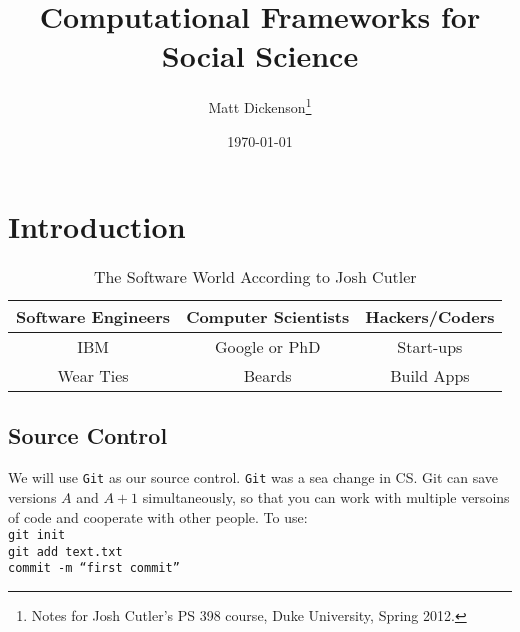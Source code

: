 \documentclass[12pt,letter]{article}
\begin{document}
\title{Computational Frameworks for Social Science}

\author{Matt Dickenson\thanks{Notes for Josh Cutler's PS 398 course, Duke
    University, Spring 2012.}}

\date{\today}

\maketitle

\section{Introduction}

\begin{table}[h!]
\begin{center}
\caption{The Software World According to Josh Cutler}
\begin{tabular}{ccc}
\\
Software Engineers & Computer Scientists & Hackers/Coders \\
\hline
IBM & Google or PhD & Start-ups \\
Wear Ties & Beards & Build Apps \\
\end{tabular}
\end{center}
\end{table}

\subsection{Source Control} We will use \texttt{Git} as our source
control. \texttt{Git} was a sea change in CS. Git can save versions
$A$ and $A+1$ simultaneously, so that you can work with multiple
versoins of code and cooperate with other people. To use:
\\
\texttt{git init} \\ %
\texttt{git add text.txt} \\ %
\texttt{commit -m ``first commit''} \\ %
\end{document}
